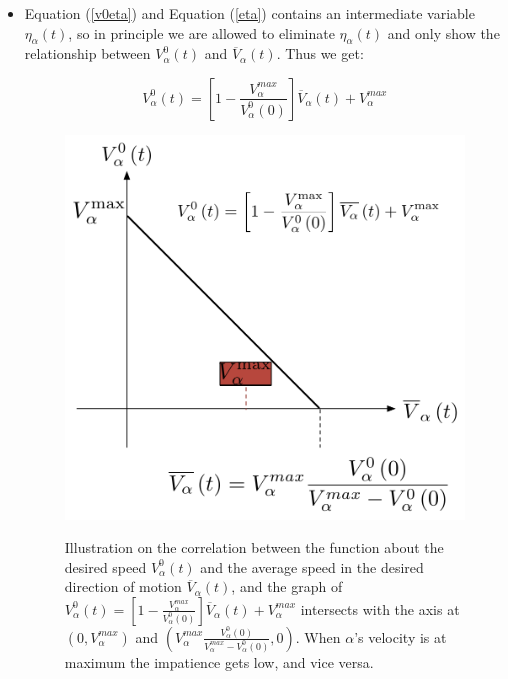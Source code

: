 \begin{itemize}
\item Equation (\ref{v0eta}) and Equation (\ref{eta}) contains an intermediate variable $ \eta_{\alpha} \left( t \right) $, 
so in principle we are allowed to eliminate $ \eta_{\alpha} \left( t \right) $ and only show the 
relationship between $ V_{\alpha}^{0}(t) $ and $ \overline{V}_{\alpha} \left( t \right) $. Thus we get:

\begin{equation}\label{vv}
    V_{\alpha}^{0}(t) = \left[ 1 - \frac{V_{\alpha}^{max}}{V_{\alpha}^{0}(0)}\right]\overline{V}_{\alpha} \left( t \right) + V_{\alpha}^{max}
\end{equation}

\begin{figure}[ht]
\centering
{\includegraphics[scale=0.35]{Figures/impatience.pdf}} 
\caption[The impatience factor]{Illustration on the correlation between the function about the desired speed $ V_{\alpha}^{0}(t) $ 
and the average speed in the desired direction of motion $ \overline{V}_{\alpha} \left( t \right) $, and the graph of
$ V_{\alpha}^{0}(t) = \left[ 1 - \frac{V_{\alpha}^{max}}{V_{\alpha}^{0}(0)}\right]\overline{V}_{\alpha} \left( t \right) + V_{\alpha}^{max} $
intersects with the axis at $ \left( 0 , V_{\alpha}^{max} 
\right)  $ and $ \left(V_{\alpha}^{max} 
		\frac{V_{\alpha}^{0} \left( 0 \right) }{V_{\alpha}^{max}-V_{\alpha}^{0} \left(0 \right)} , 0 
\right)  $.
When $\alpha$'s velocity is at maximum the impatience gets low, and vice versa.}
\label{fig:impatience}
\end{figure}


\end{itemize}
